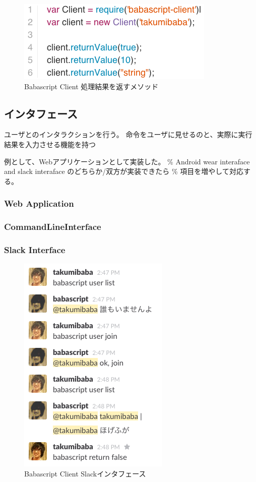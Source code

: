 \begin{figure}[htbp]
  \begin{center}
  \includegraphics[width=.8\linewidth,bb=0 0 357 149]{images/babascript_client_service_returnvalue.js.png}
  \end{center}
  \caption{Babascript Client 処理結果を返すメソッド}
  \label{fig:babascript_client_service_returnvalue}
\end{figure}

\subsection{インタフェース}\label{ux30a4ux30f3ux30bfux30d5ux30a7ux30fcux30b9}

ユーザとのインタラクションを行う。
命令をユーザに見せるのと、実際に実行結果を入力させる機能を持つ

例として、Webアプリケーションとして実装した。 \% Android wear interaface
and slack interaface のどちらか/双方が実装できたら \%
項目を増やして対応する。

\subsubsection{Web Application}\label{web-application}

\subsubsection{CommandLineInterface}\label{commandlineinterface}

\subsubsection{Slack Interface}\label{slack-interface}

\begin{figure}[htbp]
  \begin{center}
    \includegraphics[width=.3\linewidth,bb=0 0 273 402]{images/babacript_client_slack.png}
  \end{center}
  \caption{Babascript Client Slackインタフェース}
  \label{fig:babascript_client_slack}
\end{figure}

